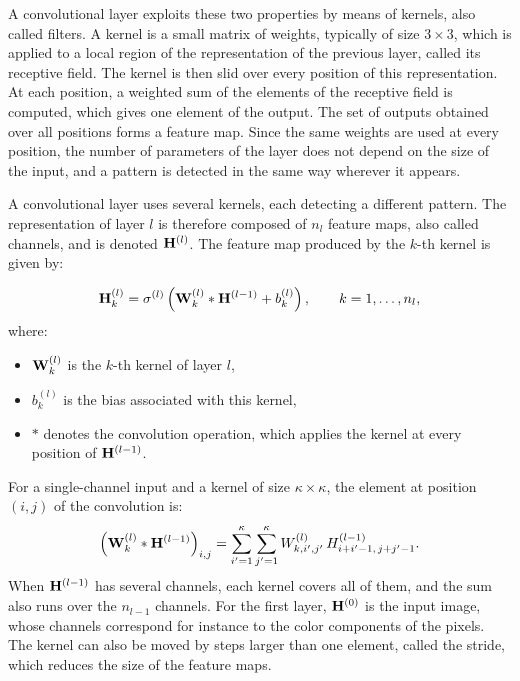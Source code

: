 A convolutional layer exploits these two properties by means of kernels, also called filters.
A kernel is a small matrix of weights, typically of size $3 \times 3$, which is applied to a local region of the representation of the previous layer, called its receptive field.
The kernel is then slid over every position of this representation.
At each position, a weighted sum of the elements of the receptive field is computed, which gives one element of the output.
The set of outputs obtained over all positions forms a feature map.
Since the same weights are used at every position, the number of parameters of the layer does not depend on the size of the input, and a pattern is detected in the same way wherever it appears.

A convolutional layer uses several kernels, each detecting a different pattern.
The representation of layer $l$ is therefore composed of $n_l$ feature maps, also called channels, and is denoted $\mathbf{H}^{(l)}$.
The feature map produced by the $k$-th kernel is given by:
\begin{equationwhere}
\begin{equation}
\mathbf{H}^{(l)}_k = \sigma^{(l)}\left(\mathbf{W}^{(l)}_k \ast \mathbf{H}^{(l-1)} + b^{(l)}_k\right), \qquad k = 1, \dots, n_l,
\label{eq:convolutional_layer}
\end{equation}
where:
\begin{itemize}
\item $\mathbf{W}^{(l)}_k$ is the $k$-th kernel of layer $l$,
\item $b^{(l)}_k$ is the bias associated with this kernel,
\item $\ast$ denotes the convolution operation, which applies the kernel at every position of $\mathbf{H}^{(l-1)}$.
\end{itemize}
\end{equationwhere}
For a single-channel input and a kernel of size $\kappa \times \kappa$, the element at position $(i, j)$ of the convolution is:
\begin{equation}
\left(\mathbf{W}^{(l)}_k \ast \mathbf{H}^{(l-1)}\right)_{i,j} = \sum_{i'=1}^{\kappa} \sum_{j'=1}^{\kappa} W^{(l)}_{k,i',j'} \, H^{(l-1)}_{i+i'-1,\, j+j'-1}.
\label{eq:convolution}
\end{equation}
When $\mathbf{H}^{(l-1)}$ has several channels, each kernel covers all of them, and the sum also runs over the $n_{l-1}$ channels.
For the first layer, $\mathbf{H}^{(0)}$ is the input image, whose channels correspond for instance to the color components of the pixels.
The kernel can also be moved by steps larger than one element, called the stride, which reduces the size of the feature maps.

